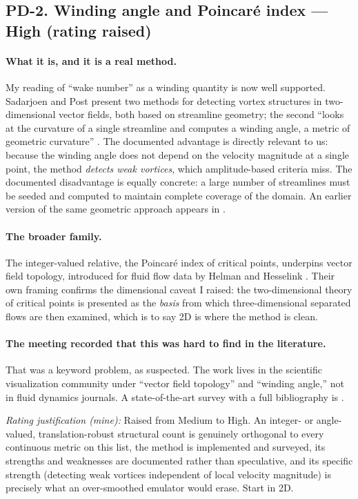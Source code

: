 \documentclass[11pt]{article}
\newcommand{\High}{\textbf{High}}
\newcommand{\rating}[1]{\par\smallskip\noindent\textit{Rating justification (mine):} #1}
\begin{document}
\subsection{PD-2. Winding angle and Poincar\'e index --- \High{} (rating raised)}

\paragraph{What it is, and it is a real method.} My reading of ``wake number'' as a winding
quantity is now well supported. Sadarjoen and Post present two methods for detecting vortex
structures in two-dimensional vector fields, both based on streamline geometry; the second
``looks at the curvature of a single streamline and computes a winding angle, a metric of
geometric curvature'' \cite{sadarjoen2000}. The documented advantage is directly relevant to
us: because the winding angle does not depend on the velocity magnitude at a single point,
the method \emph{detects weak vortices}, which amplitude-based criteria miss. The documented
disadvantage is equally concrete: a large number of streamlines must be seeded and computed
to maintain complete coverage of the domain. An earlier version of the same geometric
approach appears in \cite{sadarjoen1999}.

\paragraph{The broader family.} The integer-valued relative, the Poincar\'e index of critical
points, underpins vector field topology, introduced for fluid flow data by Helman and
Hesselink \cite{helman1989,helman1991}. Their own framing confirms the dimensional caveat I
raised: the two-dimensional theory of critical points is presented as the \emph{basis} from
which three-dimensional separated flows are then examined, which is to say 2D is where the
method is clean.

\paragraph{The meeting recorded that this was hard to find in the literature.} That was a
keyword problem, as suspected. The work lives in the scientific visualization community
under ``vector field topology'' and ``winding angle,'' not in fluid dynamics journals. A
state-of-the-art survey with a full bibliography is \cite{laramee2007}.

\rating{Raised from Medium to High. An integer- or angle-valued, translation-robust
structural count is genuinely orthogonal to every continuous metric on this list, the method
is implemented and surveyed, its strengths and weaknesses are documented rather than
speculative, and its specific strength (detecting weak vortices independent of local
velocity magnitude) is precisely what an over-smoothed emulator would erase. Start in 2D.}
\end{document}
